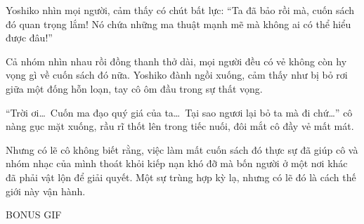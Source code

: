 \documentclass[../main.tex]{subfiles}
\begin{document}
Yoshiko nhìn mọi người, cảm thấy có chút bất lực: ``Ta đã bảo rồi mà, cuốn sách đó quan trọng lắm! Nó chứa những ma thuật mạnh mẽ mà không ai có thể hiểu được đâu!''

Cả nhóm nhìn nhau rồi đồng thanh thở dài, mọi người đều có vẻ không còn hy vọng gì về cuốn sách đó nữa. Yoshiko đành ngồi xuống, cảm thấy như bị bỏ rơi giữa một đống hỗn loạn, tay cô ôm đầu trong sự thất vọng.

``Trời ơi\dots\ Cuốn ma đạo quý giá của ta\dots\ Tại sao ngươi lại bỏ ta mà đi chứ\dots'' cô nàng gục mặt xuống, rầu rĩ thốt lên trong tiếc nuối, đôi mắt cô đầy vẻ mất mát.

Nhưng có lẽ cô không biết rằng, việc làm mất cuốn sách đó thực sự đã giúp cô và nhóm nhạc của mình thoát khỏi kiếp nạn khó đỡ mà bốn người ở một nơi khác đã phải vật lộn để giải quyết. Một sự trùng hợp kỳ lạ, nhưng có lẽ đó là cách thế giới này vận hành.

\begin{center}
  {\ab BONUS GIF}
\end{center}
\end{document}
